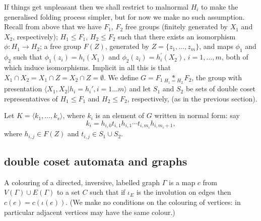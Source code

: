 \documentclass[a4paper,12pt]{article}
\newcommand{\G}{\Gamma }
\renewcommand{\i}{\iota }
\newcommand{\nul}{\emptyset }
\numberwithin{equation}{section}
\numberwithin{figure}{section}
\newcommand{\la}{\langle}
\newcommand{\ra}{\rangle}
\begin{document}
If things get unpleasant then we  shall restrict to malnormal $H_i$ to make the generalised folding process simpler, but for now we make no such assumption.
 Recall from above that we have 
$F_1$, $F_2$ free groups (finitely generated by $X_1$ 
and $X_2$, respectively); 
 $H_1 \leq F_1$, $H_2 \leq F_2$ such that 
there exists an isomorphism $\phi: H_1 \rightarrow H_2$; a free group 
 $F(Z)$, generated by $Z=\{z_1, \ldots, z_m\}$, 
and  maps $\phi_1$ and $\phi_2$ such that 
$\phi_1(z_i)=h_i(X_1)  $ and  $\phi_2(z_i)=h^\prime_i(X_2)$, $i=1,\ldots ,m$,
both of which induce isomorphisms. 
Implicit in all this is that $X_1\cap X_2=X_1\cap Z = X_2\cap Z=\nul$. 
We define 
${G = F_1 \underset{H_1=H_2}{\ast} F_2}$, the group with  
 presentation $\la X_1,X_2 | h_i = h_i', i=1 \ldots m\ra$ and 
let $S_1$ and $S_2$ be sets of  double coset representatives of 
$H_1\le F_1$ and $H_2\le F_2$, respectively, (as in  the 
previous section).

Let $K=\la k_1, \ldots , k_s\ra$, where $k_i$ is an element of $G$ written
in normal form: say
\begin{equation}\label{eq:k-form}
k_i= h_{i,0}t_{i,1}h_{i,1}\cdots t_{i,m_i}h_{i,m_i+1},
\end{equation}
where $h_{i,j}\in F(Z)$ and $t_{i,j}\in S_1\cup S_2$.   
\subsection{double coset automata and graphs}

A colouring of a directed, inversive, labelled graph $\G$ is a map $c$  from $V(\G)\cup E(\G)$
 to a set $C$ such that if $\i_E$ is the involution on edges 
then $c(e)=c(\i(e))$. (We make no conditions on the colouring of vertices:
in particular adjacent vertices may have the same colour.)
\end{document}
